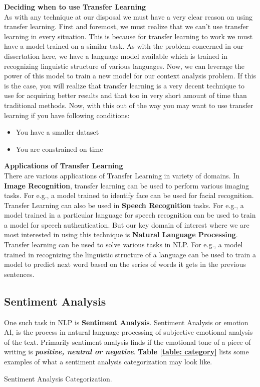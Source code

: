 \documentclass[a4paper, 12pt]{article}
\begin{document}
\begin{sloppypar}
\large \textbf{Deciding when to use Transfer Learning} \\ [0.5ex]
\normalsize
As with any technique at our disposal we must have a very clear reason on using transfer learning. First and foremost, we must realize that we can't use transfer learning in every situation. This is because for transfer learning to work we must have a model trained on a similar task. As with the problem concerned in our dissertation here, we have  a language model available which is trained in recognizing linguistic structure of  various languages. Now, we can leverage the power of this model to train a new model for our context analysis problem. If this is the case, you will realize that transfer learning is a very decent technique to use for acquiring better results and that too in very short amount of time than traditional methods. Now, with this out of the way you may want to use transfer learning if you have following conditions:
\begin{itemize}
\item{You have a smaller dataset}
\item{You are constrained on time}
\end{itemize}

\large \textbf{Applications of Transfer Learning} \\ [0.5ex]
\normalsize
There are various applications of Transfer Learning in variety of domains. In \textbf{Image Recognition}, transfer learning can be used to perform various imaging tasks. For e.g.,  a model trained to identify face can be used for facial recognition. Transfer Learning can also be used in \textbf{Speech Recognition} tasks.  For e.g., a model trained in a particular language for speech recognition can be used to train a model for speech authentication. But our key domain of interest where we are most interested in using this technique is \textbf{Natural Language Processing}. Transfer learning can be used to solve various tasks in  NLP. For e.g., a model trained in recognizing the linguistic structure of a language can be used to train a model to predict next word based on the series of words it gets in the previous sentences.

\subsection{Sentiment Analysis}
One such task in NLP is \textbf{Sentiment Analysis}. Sentiment Analysis or emotion AI, is the process in natural language processing  of subjective emotional analysis of the text. Primarily sentiment analysis finds if the emotional tone of a piece of writing is \textbf{\textit{positive, neutral or negative}}. \textbf{Table \ref{table: category}} lists some examples of what a sentiment analysis categorization may look like.
\begin{table}[H]
\caption{ Sentiment Analysis Categorization.\label{table: category}}


\end{table}
\end{sloppypar}
\end{document}
